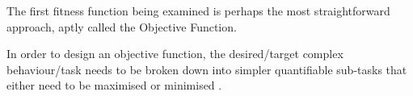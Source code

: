 
The first fitness function being examined is perhaps the most straightforward approach, aptly called the Objective Function.

In order to design an objective function, the desired/target complex behaviour/task needs to be broken down into simpler quantifiable sub-tasks that either need to be maximised or minimised \cite{lehman2011abandoning}.

